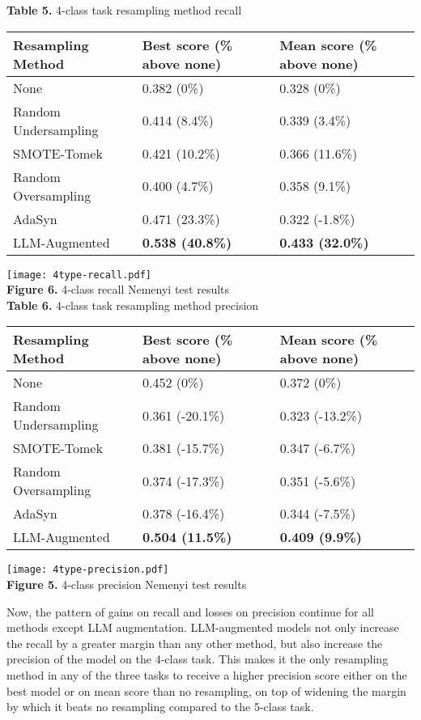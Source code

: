 \documentclass[runningheads]{llncs}
\newenvironment{nscenter}
 {\parskip=0pt\par\nopagebreak\centering}
 {\par\noindent\ignorespacesafterend}
\begin{document}
\begin{nscenter}
{\bf Table 5.} 4-class task resampling method recall\\

\begin{tabular}{|l|l|l|}
\hline
Resampling Method & Best score (\% above none) & Mean score (\% above none) \\\hline
None &  0.382 (0\%) & 0.328 (0\%) \\\hline
Random Undersampling & 0.414 (8.4\%) & 0.339 (3.4\%) \\\hline
SMOTE-Tomek & 0.421 (10.2\%) & 0.366 (11.6\%) \\\hline
Random Oversampling & 0.400 (4.7\%) & 0.358 (9.1\%) \\\hline
AdaSyn & 0.471 (23.3\%) & 0.322 (-1.8\%) \\\hline
LLM-Augmented &  {\bf 0.538 (40.8\%)} & {\bf 0.433 (32.0\%)} \\\hline
\end{tabular}

\texttt{[image: 4type-recall.pdf]}\\
{\bf Figure 6.} 4-class recall Nemenyi test results\\
\vspace{\baselineskip}
{\bf Table 6.} 4-class task resampling method precision\\

\begin{tabular}{|l|l|l|}
\hline
Resampling Method & Best score (\% above none) & Mean score (\% above none) \\\hline
None & 0.452 (0\%) & 0.372 (0\%) \\\hline
Random Undersampling & 0.361 (-20.1\%) & 0.323 (-13.2\%) \\\hline
SMOTE-Tomek & 0.381 (-15.7\%) & 0.347 (-6.7\%) \\\hline
Random Oversampling & 0.374 (-17.3\%) & 0.351 (-5.6\%) \\\hline
AdaSyn & 0.378 (-16.4\%) & 0.344 (-7.5\%) \\\hline
LLM-Augmented & {\bf 0.504 (11.5\%)} & {\bf 0.409 (9.9\%)} \\\hline
\end{tabular}

\texttt{[image: 4type-precision.pdf]}\\
{\bf Figure 5.} 4-class precision Nemenyi test results
\end{nscenter}
Now, the pattern of gains on recall and losses on precision continue for all methods except LLM augmentation. LLM-augmented models not only increase the recall by a greater margin than any other method, but also increase the precision of the model on the 4-class task. This makes it the only resampling method in any of the three tasks to receive a higher precision score either on the best model or on mean score than no resampling, on top of widening the margin by which it beats no resampling compared to the 5-class task.
\end{document}
